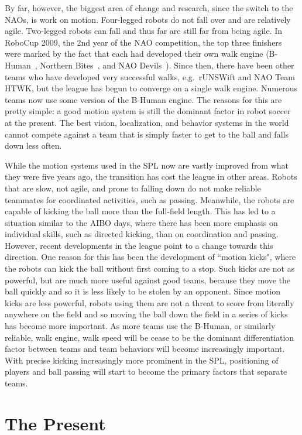 \documentclass{llncs}
\begin{document}
By far, however, the biggest area of change and research, since the
switch to the NAOs, is work on motion. Four-legged robots do not fall
over and are relatively agile. Two-legged robots can fall and thus far
are still far from being agile. In RoboCup 2009, the 2nd year of the NAO competition, the top three
finishers were marked by the fact that each had developed
their own walk engine (B-Human~\cite{NaoWalking-WHSR-2009}, Northern Bites~\cite{strom-10}, and
NAO Devils~\cite{czarnetzki}). Since then, there have been other teams who have developed
very successful walks, e.g.~rUNSWift and NAO Team HTWK,
but the league has begun to converge on a single walk engine. Numerous
teams now use some version of the B-Human engine. The reasons
for this are pretty simple: a good motion system is still the dominant factor
in robot soccer at the present. The best vision, localization, and behavior
systems in the world cannot compete against a team that is simply
faster to get to the ball and falls down less often.

While the motion systems used in the SPL now are vastly improved from what they were
five years ago, the transition has cost the league in other areas. Robots that
are slow, not agile, and prone to falling down do not make reliable teammates 
for coordinated activities, such as passing. Meanwhile, the robots are
capable of kicking the ball more than the full-field length. This has led
to a situation similar to the AIBO days, where there has been more emphasis
on individual skills, such as directed kicking, than on coordination and passing.
However, recent developments in the league point to a change towards this
direction. One reason for this has been the development of ``motion
kicks", where the robots can kick the ball without first coming to a stop.
Such kicks are not as powerful, but are much more useful against good teams, because they
move the ball quickly and so it is less likely to be stolen
by an opponent. Since motion kicks are less powerful, robots using them are not
a threat to score from literally anywhere on the field and so moving the
ball down the field in a series of kicks has become more important.
As more teams use the B-Human, or similarly reliable,
walk engine, walk speed will be cease to be the dominant differentiation factor
between teams and team behaviors will become increasingly important. With
precise kicking increasingly more prominent in the SPL, positioning of players and ball passing will
start to become the primary factors that separate teams.

\section{The Present}
\end{document}
